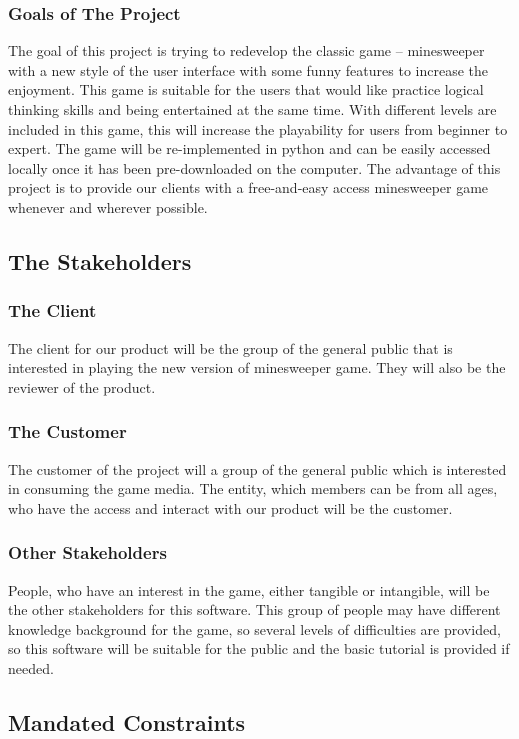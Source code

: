 \documentclass[10pt]{article}
\begin{document}
\subsubsection{Goals of The Project}
The goal of this project is trying to redevelop the classic game -- minesweeper with a new style of the user interface with some funny features to increase the
enjoyment. This game is suitable for the users that would like practice logical thinking skills and being entertained at the same time. With different levels are included in this game, this will increase the playability for users from beginner to expert. The game will be re-implemented in python and can be easily accessed locally once it has been pre-downloaded on the computer. The advantage of this project is to provide our clients with a free-and-easy access minesweeper game whenever and wherever possible.
\subsection{The Stakeholders}
\subsubsection{The Client}
The client for our product will be the group of the general public that is interested in playing the new version of minesweeper game. They will also be the reviewer of the product. 
\subsubsection{The Customer}
The customer of the project will a group of the general public which is interested in consuming the game media. The entity, which members can be from all ages, who have the access and interact with our product will be the customer. 
\subsubsection{Other Stakeholders}
People, who have an interest in the game, either tangible or intangible, will be the other stakeholders for this software. 
This group of people may have different knowledge background for the game, so several levels of difficulties are provided, so this software will be suitable for the public and the basic tutorial is provided if needed.
\subsection{Mandated Constraints}
\end{document}
